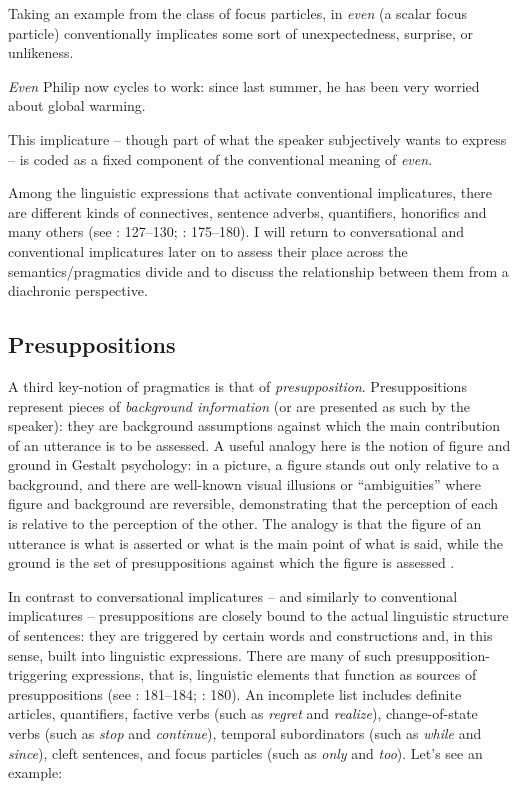 Taking an example from the class of focus particles, in  \textit{even} (a scalar focus particle) conventionally implicates some sort of unexpectedness, surprise, or unlikeness.

\ea%
    \label{ex:key:5}
    
          \textit{Even} Philip now cycles to work: since last summer, he has been very worried about global warming.
    \z %

This implicature – though part of what the speaker subjectively wants to express – is coded as a fixed component of the conventional meaning of \textit{even}.

\hspace*{-2.3pt}Among the linguistic expressions that activate conventional implicatures, there are different kinds of connectives, sentence adverbs, quantifiers, honorifics and many others (see \citealt{Levinson1983}: 127–130; \citealt{Huang2017}: 175–180). I will return to conversational and conventional implicatures later on to assess their place across the semantics/pragmatics divide and to discuss the relationship between them from a diachronic perspective.

\subsection{Presuppositions}
\hypertarget{Toc124860618}{}
A third key-notion of pragmatics is that of \textit{presupposition}. Presuppositions represent pieces of \textit{background information} (or are presented as such by the speaker): they are background assumptions against which the main contribution of an utterance is to be assessed. A useful analogy here is the notion of figure and ground in Gestalt psychology: in a picture, a figure stands out only relative to a background, and there are well-known visual illusions or “ambiguities” where figure and background are reversible, demonstrating that the perception of each is relative to the perception of the other. The analogy is that the figure of an utterance is what is asserted or what is the main point of what is said, while the ground is the set of presuppositions against which the figure is assessed \citep[180]{Levinson1983}.

In contrast to conversational implicatures – and similarly to conventional implicatures – presuppositions are closely bound to the actual linguistic structure of sentences: they are triggered by certain words and constructions and, in this sense, built into linguistic expressions. There are many of such presupposition-triggering expressions, that is, linguistic elements that function as sources of presuppositions (see \citealt{Levinson1983}: 181–184; \citealt{Geurts2017}: 180). An incomplete list includes definite articles, quantifiers, factive verbs (such as \textit{regret} and \textit{realize}), change-of-state verbs (such as \textit{stop} and \textit{continue}), temporal subordinators (such as \textit{while} and \textit{since}), cleft sentences, and focus particles (such as \textit{only} and \textit{too}). Let’s see an example:

